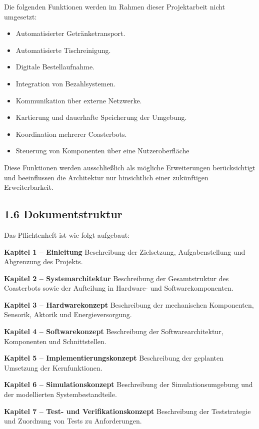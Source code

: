 \documentclass[
]{article}
\providecommand{\tightlist}{%
  \setlength{\itemsep}{0pt}\setlength{\parskip}{0pt}}
\begin{document}
Die folgenden Funktionen werden im Rahmen dieser Projektarbeit nicht
umgesetzt:

\begin{itemize}
\tightlist
\item
  Automatisierter Getränketransport.
\item
  Automatisierte Tischreinigung.
\item
  Digitale Bestellaufnahme.
\item
  Integration von Bezahlsystemen.
\item
  Kommunikation über externe Netzwerke.
\item
  Kartierung und dauerhafte Speicherung der Umgebung.
\item
  Koordination mehrerer Coasterbots.
\item
  Steuerung von Komponenten über eine Nutzeroberfläche
\end{itemize}

Diese Funktionen werden ausschließlich als mögliche Erweiterungen
berücksichtigt und beeinflussen die Architektur nur hinsichtlich einer
zukünftigen Erweiterbarkeit.

\subsection{1.6 Dokumentstruktur}\label{dokumentstruktur}

Das Pflichtenheft ist wie folgt aufgebaut:

\textbf{Kapitel 1 -- Einleitung} Beschreibung der Zielsetzung,
Aufgabenstellung und Abgrenzung des Projekts.

\textbf{Kapitel 2 -- Systemarchitektur} Beschreibung der Gesamtstruktur
des Coasterbots sowie der Aufteilung in Hardware- und
Softwarekomponenten.

\textbf{Kapitel 3 -- Hardwarekonzept} Beschreibung der mechanischen
Komponenten, Sensorik, Aktorik und Energieversorgung.

\textbf{Kapitel 4 -- Softwarekonzept} Beschreibung der
Softwarearchitektur, Komponenten und Schnittstellen.

\textbf{Kapitel 5 -- Implementierungskonzept} Beschreibung der geplanten
Umsetzung der Kernfunktionen.

\textbf{Kapitel 6 -- Simulationskonzept} Beschreibung der
Simulationsumgebung und der modellierten Systembestandteile.

\textbf{Kapitel 7 -- Test- und Verifikationskonzept} Beschreibung der
Teststrategie und Zuordnung von Tests zu Anforderungen.
\end{document}
